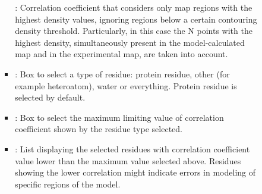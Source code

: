 \begin{itemize}
\begin{itemize}
\begin{itemize}
\begin{itemize}
           : Correlation coefficient that considers only map regions with the highest density values, ignoring regions below a certain contouring density threshold. Particularly, in this case the N points with the highest density, simultaneously present in the model-calculated map and in the experimental map, are taken into account.

          \item {}: Box to select a type of residue: protein residue, other (for example heteroatom), water or everything. Protein residue is selected by default.
          \item {}: Box to select the maximum limiting value of correlation coefficient shown by the residue type selected. 
          \item {}: List displaying the selected residues with correlation coefficient value lower than the maximum value selected above. Residues showing the lower correlation might indicate errors in modeling of specific regions of the model.
         \end{itemize}
         

\end{itemize}
\end{itemize}
\end{itemize}

